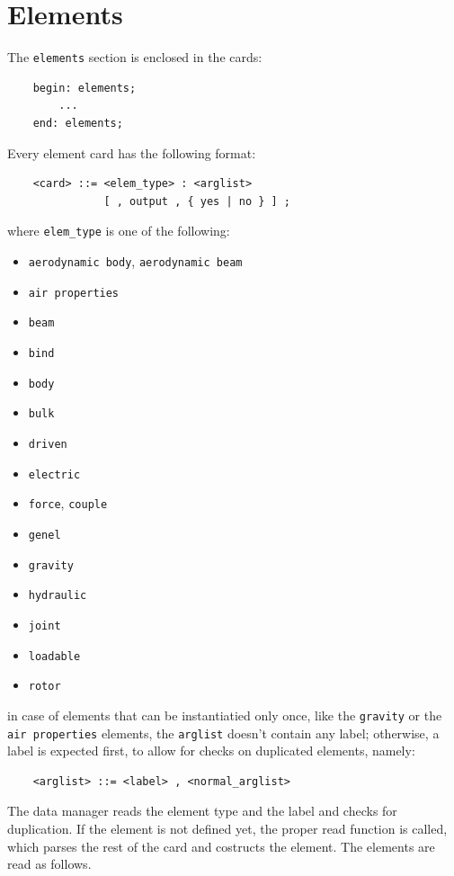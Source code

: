\chapter{Elements}
The \texttt{elements} section is enclosed in the cards:
\begin{verbatim}
    begin: elements;
        ...
    end: elements;
\end{verbatim}
Every element card has the following format:
\begin{verbatim}
    <card> ::= <elem_type> : <arglist>
               [ , output , { yes | no } ] ;
\end{verbatim}
where \texttt{elem\_type} is one of the following:
\begin{itemize}
  \item \texttt{aerodynamic body}, \texttt{aerodynamic beam}
  \item \texttt{air properties}
  \item \texttt{beam}
  \item \texttt{bind}
  \item \texttt{body}
  \item \texttt{bulk}
  \item \texttt{driven}
  \item \texttt{electric}
  \item \texttt{force}, \texttt{couple}
  \item \texttt{genel}
  \item \texttt{gravity}
  \item \texttt{hydraulic}
  \item \texttt{joint}
  \item \texttt{loadable}
  \item \texttt{rotor}
\end{itemize}
in case of elements that can be instantiatied only once, like
the \texttt{gravity} or the \texttt{air properties} elements, the \texttt{arglist}
doesn't contain any label; otherwise, a label is expected first, to allow 
for checks on duplicated elements, namely: 
\begin{verbatim}
    <arglist> ::= <label> , <normal_arglist>
\end{verbatim}
The data manager reads the element type and the label and checks for
duplication. If the element is not defined yet, the proper read function is
called, which parses the rest of the card and costructs the element.
The elements are read as follows.



